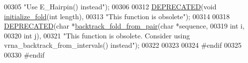 \begin{DoxyCode}
00305 \textcolor{stringliteral}{"Use E\_Hairpin() instead"});
00306 
00312 \mbox{\hyperlink{fold_8h_aab347a3c03fbe8e7319551b9fa0cce4a}{DEPRECATED}}(\textcolor{keywordtype}{void} \mbox{\hyperlink{group__mfe__fold__single_gac3f0a28d9cb609d388b155445073fd20}{initialize\_fold}}(\textcolor{keywordtype}{int} length),
00313 \textcolor{stringliteral}{"This function is obsolete"});
00314 
00318 \mbox{\hyperlink{fold_8h_aab347a3c03fbe8e7319551b9fa0cce4a}{DEPRECATED}}(\textcolor{keywordtype}{char} *\mbox{\hyperlink{group__mfe__fold__single_ga33c35bfd60df9d7a97aec72b887e6858}{backtrack\_fold\_from\_pair}}(\textcolor{keywordtype}{char} *sequence,
00319                                           \textcolor{keywordtype}{int} i,
00320                                           \textcolor{keywordtype}{int} j),
00321 \textcolor{stringliteral}{"This function is obsolete. Consider using vrna\_backtrack\_from\_intervals() instead"});
00322 
00323 
00324 \textcolor{preprocessor}{#endif}
00325 
00330 \textcolor{preprocessor}{#endif}
\end{DoxyCode}
